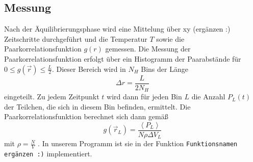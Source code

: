 \subsection*{Messung}
Nach der Äquilibrierungsphase wird eine Mittelung über xy (ergänzen :) Zeitschritte durchgeführt und die Temperatur $T$
sowie die Paarkorrelationsfunktion $g(r)$ gemessen.
Die Messung der Paarkorrelationsfunktion erfolgt über ein Histogramm der Paarabstände für $0 \leq g(\vec{r}) \leq \frac{L}{2}$.
Dieser Bereich wird in $N_H$ Bins der Länge
\begin{equation*}
    \Delta r = \frac{L}{2 N_H}
\end{equation*} 
eingeteilt. Zu jedem Zeitpunkt $t$ wird dann 
für jeden Bin $L$ die Anzahl $P_L(t)$ der Teilchen, die sich in diesem Bin befinden, ermittelt.
Die Paarkorrelationsfunktion berechnet sich dann gemäß
\begin{equation*}
    g \left(\vec{r}_L\right) = \frac{\left\langle P_L \right\rangle}{N \rho \Delta V_L}
\end{equation*}
mit $\rho =  \frac{N}{V}$ .
In unserem Programm ist sie in der Funktion \texttt{Funktionsnamen ergänzen :)} implementiert. 

